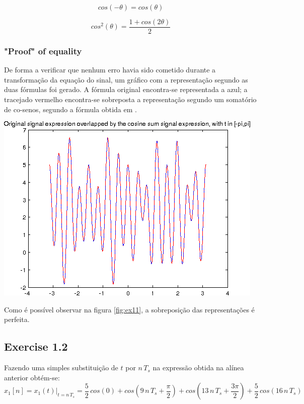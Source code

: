 \documentclass[a4paper]{article}
\begin{document}
\begin{equation}
cos(-\theta) = cos(\theta)
\tag{7 to 8}
\end{equation}

\begin{equation}
cos^2(\theta) = \frac{1 + cos(2 \theta)}{2}
\tag{8 to 9}
\end{equation}

\subsubsection{"Proof" of equality}
\noindent De forma a verificar que nenhum erro havia sido cometido durante a transformação da equação do sinal, um gráfico com a representação segundo as duas fórmulas foi gerado. A fórmula original encontra-se representada a azul; a tracejado vermelho encontra-se sobreposta a representação segundo um somatório de co-senos, segundo a fórmula obtida em \emph{}.

\begin{center}
	\includegraphics[scale=0.75]{images/ex11.png}
	\label{fig:ex11}
\end{center}

\noindent Como é possível observar na figura \ref{fig:ex11}, a sobreposição das representações é perfeita.

\subsection{Exercise 1.2}
Fazendo uma simples substituição de $t$ por $n \, T_{s}$ na expressão obtida na alínea anterior obtém-se:
\begin{equation}
	x_{1}[n] = x_{1}(t) |_{t = n \, T_{s}} = \frac{5}{2} \, cos(0) + cos\left(9 \, n \, T_{s} + \frac{\pi}{2}\right) + cos\left(13 \, n \, T_{s} + \frac{3 \pi}{2}\right) + \frac{5}{2} \, cos(16 \, n \, T_{s})
\end{equation}
\end{document}
